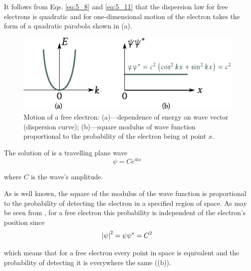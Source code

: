 It follows from Eqs. \eqref{eq:5_8} and \eqref{eq:5_11} that the dispersion law for free electrons is quadratic and for one-dimensional motion of the electron takes the form of a quadratic parabola shown in (a).

\begin{figure}[t]
	\begin{center}
		\includegraphics[scale=1.1]{figures/ch_05/fig_5_8.pdf}
		\caption[]{Motion of a free electron: (a)---dependence of energy on wave vector (dispersion curve); (b)---square modulus of wave function proportional to the probability of the electron being at point $x$.}
		\label{fig:5_8}
	\end{center}
	\vspace{-0.7cm}
\end{figure}

The solution of  is a travelling plane wave
\begin{equation}\label{eq:5_12}
    \psi = C e^{ikx}
\end{equation}

\noindent
where $C$ is the wave's amplitude.

As is well known, the square of the modulus of the wave function is proportional to the probability of detecting the electron in a specified region of space. As may be seen from , for a free electron this probability is independent of the electron's position since
\begin{equation}\label{eq:5_13}
    \left| \psi \right|^2 = \psi\psi^* = C^2
\end{equation}

\noindent
which means that for a free electron every point in space is equivalent and the probability of detecting it is everywhere the same ((b)).

